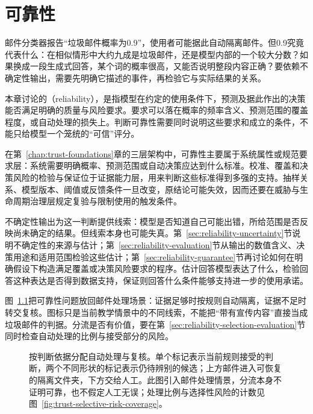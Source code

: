\chapter{可靠性}
\label{chap:trust-reliability}

邮件分类器报告“垃圾邮件概率为0.9”，使用者可能据此自动隔离邮件。但0.9究竟代表什么：在相似情形中大约九成是垃圾邮件，还是模型内部的一个较大分数？如果换成一段生成式回答，某个词的概率很高，又能否说明整段内容正确？要依赖不确定性输出，需要先明确它描述的事件，再检验它与实际结果的关系。

本章讨论的（reliability），是指模型在约定的使用条件下，预测及据此作出的决策能否满足明确的质量与风险要求。要求可以落在概率的频率含义、预测范围的覆盖程度，或自动处理的损失上。判断可靠性需要同时说明这些要求和成立的条件，不能只给模型一个笼统的“可信”评分。

在第~\ref{chap:trust-foundations}章的三层架构中，可靠性主要属于系统属性或规范要求层：系统需要明确概率、预测范围或自动决策应达到什么标准。校准、覆盖和决策风险的检验与保证位于证据能力层，用来判断这些标准得到多强的支持。抽样关系、模型版本、阈值或反馈条件一旦改变，原结论可能失效，因而还要在威胁与生命周期治理层规定复验与限制使用的触发条件。

不确定性输出为这一判断提供线索：模型是否知道自己可能出错，所给范围是否反映尚未确定的结果。但线索本身也可能失真。第~\ref{sec:reliability-uncertainty}节说明不确定性的来源与估计；第~\ref{sec:reliability-evaluation}节从输出的数值含义、决策用途和适用范围检验这些估计；第~\ref{sec:reliability-guarantee}节再讨论如何在明确假设下构造满足覆盖或决策风险要求的程序。估计回答模型表达了什么，检验回答这种表达是否得到数据支持，保证则回答什么条件能够支持进一步的使用承诺。

图~\ref{fig:trust-reliability-review}把可靠性问题放回邮件处理场景：证据足够时按规则自动隔离，证据不足时转交复核。图标只是当前教学情景中的不同线索，不能把“带有宣传内容”直接当成垃圾邮件的判据。分流是否有价值，要在第~\ref{sec:reliability-selection-evaluation}节同时检查自动处理的比例与接受部分的风险。

\begin{figure}[!htb]
  \centering
  \caption{按判断依据分配自动处理与复核。单个标记表示当前规则接受的判断，两个不同形状的标记表示仍待辨别的候选；上方邮件进入可恢复的隔离文件夹，下方交给人工。此图引入邮件处理情景，分流本身不证明可靠，也不假定人工无误；处理比例与选择性风险的计数见图~\ref{fig:trust-selective-risk-coverage}。}
  \label{fig:trust-reliability-review}
\end{figure}

